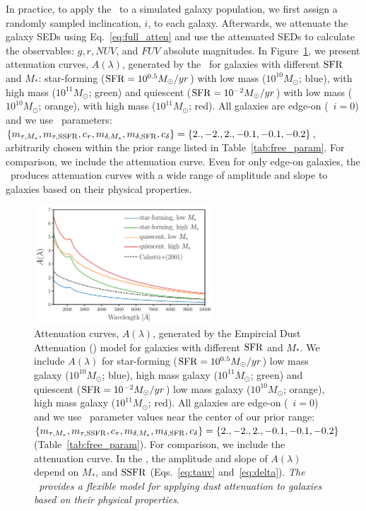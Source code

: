 In practice, to apply the \eda~to a simulated galaxy population, we first
assign a randomly sampled inclincation, $i$, to each galaxy. 
Afterwards, we attenuate the galaxy SEDs using Eq.~\ref{eq:full_atten} and use
the attenuated SEDs to calculate the observables: $g, r, NUV$, and $FUV$
absolute magnitudes. In Figure~\ref{fig:dem_av}, we present attenuation
curves,
$A(\lambda)$, generated by the \eda~for galaxies with different ${\rm SFR}$ and $M_*$: 
star-forming (${\rm SFR}=10^{0.5}M_\odot/yr$) with low mass ($10^{10}M_\odot$;
blue), with high mass ($10^{11}M_\odot$; green) and quiescent
(${\rm SFR}=10^{-2}M_\odot/yr$) with low mass ($10^{10}M_\odot$; orange), with high
mass ($10^{11}M_\odot$; red). All galaxies are edge-on (\ie~$i=0$) and we use
\eda~parameters: $\{m_{\tau,M_*}, m_{\tau,{\rm SSFR}}, c_\tau, m_{\delta,M_*}, m_{\delta,{\rm SFR}}, c_\delta\} =
\{2., -2., 2., -0.1, -0.1, -0.2\}$, arbitrarily chosen within the prior range
listed in Table~\ref{tab:free_param}. For comparison, we include the
\cite{calzetti2001} attenuation curve. Even for only edge-on galaxies, the
\eda~produces attenuation curves with a wide range of amplitude and
slope to galaxies based on their physical properties. 

\begin{figure}
\begin{center}
    \includegraphics[width=0.6\textwidth]{figs/dems.pdf}
    \caption{\label{fig:dem_av}
    Attenuation curves, $A(\lambda)$, generated by the Empircial Dust Attenuation (\eda)
    model for galaxies with different ${\rm SFR}$ and $M_*$. We include $A(\lambda)$ for 
    star-forming (${\rm SFR}=10^{0.5}M_\odot/yr$) low mass galaxy ($10^{10}M_\odot$;
    blue), high mass galaxy ($10^{11}M_\odot$; green) and quiescent
    (${\rm SFR}=10^{-2}M_\odot/yr$) low mass galaxy ($10^{10}M_\odot$; orange), 
    high mass galaxy ($10^{11}M_\odot$; red). All galaxies are edge-on
    (\ie~$i=0$) and we use \eda~parameter values near the center of our prior
    range:$\{m_{\tau,M_*}, m_{\tau,{\rm SSFR}}, c_\tau, m_{\delta,M_*}, m_{\delta,{\rm SFR}}, c_\delta\} = \{2.,
    -2., 2., -0.1, -0.1, -0.2\}$ (Table~\ref{tab:free_param}). For comparison,
    we include the \cite{calzetti2001} attenuation curve. In the \eda, the
    amplitude and slope of $A(\lambda)$ depend on $M_*$, and ${\rm SSFR}$ (Eqs.~\ref{eq:tauv}
    and~\ref{eq:delta}). {\em The \eda~provides a flexible model for
    applying dust attenuation to galaxies based on their physical properties}.
    } 
\end{center}
\end{figure}


